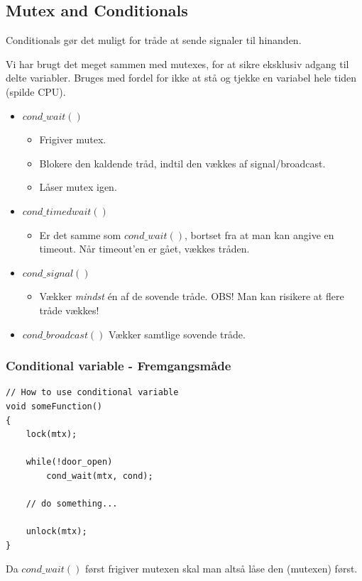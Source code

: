 \subsection{Mutex and Conditionals}
Conditionals gør det muligt for tråde at sende signaler til hinanden.

Vi har brugt det meget sammen med mutexes, for at sikre eksklusiv adgang til delte variabler. Bruges med fordel for ikke at stå og tjekke en variabel hele tiden (spilde CPU).

\begin{itemize}
	\item $cond\_wait()$
	\begin{itemize}
		\item Frigiver mutex.
		\item Blokere den kaldende tråd, indtil den vækkes af signal/broadcast.
		\item Låser mutex igen.
	\end{itemize}
	\item $cond\_timedwait()$
	\begin{itemize}
		\item Er det samme som $cond\_wait()$, bortset fra at man kan angive en timeout. Når timeout'en er gået, vækkes tråden.
	\end{itemize}
	\item $cond\_signal()$
	\begin{itemize}
		\item Vækker \textit{mindst} én af de sovende tråde. OBS! Man kan risikere at flere tråde vækkes!
	\end{itemize}
	\item $cond\_broadcast()$
	Vækker samtlige sovende tråde.
\end{itemize}

\subsubsection{Conditional variable - Fremgangsmåde}

\begin{lstlisting}[otherkeywords={lock, unlock}]
// How to use conditional variable
void someFunction()
{
	lock(mtx);
	
	while(!door_open)
		cond_wait(mtx, cond);
		
	// do something...
	
	unlock(mtx);
}
\end{lstlisting}
Da $cond\_wait()$ først frigiver mutexen skal man altså låse den (mutexen) først.\\

